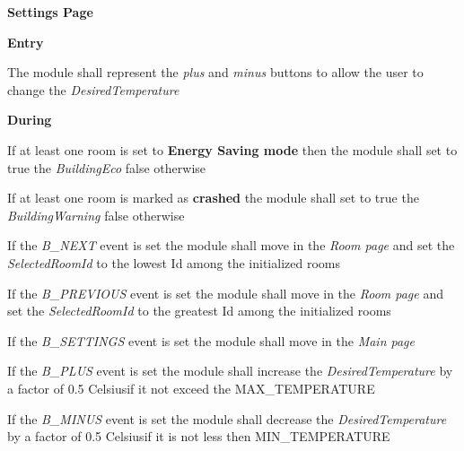 \begin{req_enum}
\begin{req_enum}[label*=\arabic*.]
					\item \textbf{Settings Page}
						\begin{req_enum}[label*=\arabic*.]
							\item \textbf{Entry}
							\begin{req_enum}[label*=\arabic*.]
								\item The module shall represent the \textit{plus} and \textit{minus} buttons to allow the user to change the \textit{DesiredTemperature} \\
							\end{req_enum}	
							\item \textbf{During}
							\begin{req_enum}[label*=\arabic*.]
								\item If at least one room is set to \textbf{Energy Saving mode} then the module shall set to true the \textit{BuildingEco} false otherwise \\
								\item If at least one room is marked as \textbf{crashed} the module shall set to true the \textit{BuildingWarning} false otherwise \\

								\item If the \textit{B\_NEXT} event is set the module shall move in the \textit{Room page} and set the \textit{SelectedRoomId} to the lowest Id among the initialized rooms \\
								\item If the \textit{B\_PREVIOUS} event is set the module shall move in the \textit{Room page} and set the \textit{SelectedRoomId} to the greatest Id among the initialized rooms \\
								\item If the \textit{B\_SETTINGS} event is set the module shall move in the \textit{Main page}
								\item If the \textit{B\_PLUS} event is set the module shall increase the \textit{DesiredTemperature} by a factor of 0.5 Celsius\degree if it not exceed the MAX\_TEMPERATURE
								\item If the \textit{B\_MINUS} event is set the module shall decrease the \textit{DesiredTemperature} by a factor of 0.5 Celsius\degree if it is not less then MIN\_TEMPERATURE


\end{req_enum}
\end{req_enum}
\end{req_enum}
\end{req_enum}
